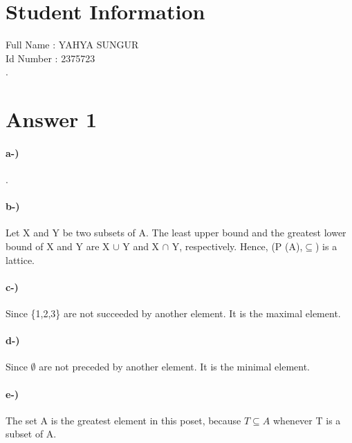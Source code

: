 \documentclass[12pt]{article}
\begin{document}
\section*{Student Information } 
Full Name : YAHYA SUNGUR \\
Id Number : 2375723 \\
.
\section*{Answer 1}
\paragraph{a-)}.\\
\paragraph{b-)}
Let X and Y be two subsets of A. The least upper bound and the greatest lower bound of X and Y are X $\cup$ Y and X $\cap$ Y, respectively. Hence, (P (A),$\subseteq$) is a lattice.
\paragraph{c-)}
Since \{1,2,3\} are not succeeded by another element. It is the maximal element.
\paragraph{d-)}
Since $\emptyset$ are not preceded by another element. It is the minimal element.
\paragraph{e-)}
The set A is the greatest element in this poset, because $T \subseteq A$ whenever T is a subset of A.
\end{document}

